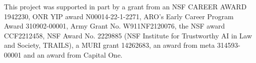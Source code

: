 This project was supported in part by a grant from an NSF CAREER AWARD 1942230, ONR YIP award N00014-22-1-2271, ARO’s Early Career Program Award 310902-00001, Army Grant No. W911NF2120076, the NSF award CCF2212458, NSF Award No. 2229885 (NSF Institute for Trustworthy AI in Law and Society, TRAILS), a MURI grant 14262683, an award from meta 314593-00001 and an award from Capital One.